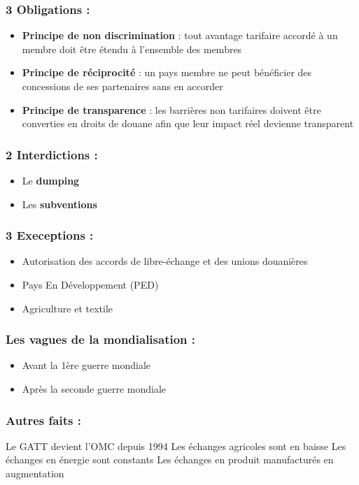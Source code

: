 \subsubsection{3 Obligations : }
\begin{itemize}
    \item \textbf{Principe de non discrimination} : tout avantage tarifaire accordé à un membre doit être étendu à l’ensemble des membres
    \item \textbf{Principe de réciprocité} : un pays membre ne peut bénéficier des concessions de ses partenaires sans en accorder
    \item \textbf{Principe de transparence} : les barrières non tarifaires doivent être converties en droits de douane afin que leur impact réel devienne transparent
\end{itemize}
\subsubsection{2 Interdictions : }
\begin{itemize}
    \item Le \textbf{dumping}
    \item Les \textbf{subventions}
\end{itemize}
\subsubsection{3 Execeptions : }
\begin{itemize}
    \item Autorisation des accords de libre-échange et des unions douanières
    \item Pays En Développement (PED)
    \item Agriculture et textile
\end{itemize}
\subsubsection{Les vagues de la mondialisation :}
\begin{itemize}
    \item Avant la 1ère guerre mondiale
    \item Après la seconde guerre mondiale \newline
\end{itemize}
\subsubsection{Autres faits :}
Le GATT devient l'OMC depuis 1994 \newline
Les échanges agricoles sont en baisse \newline
Les échanges en énergie sont constants \newline
Les échanges en produit manufacturés en augmentation
